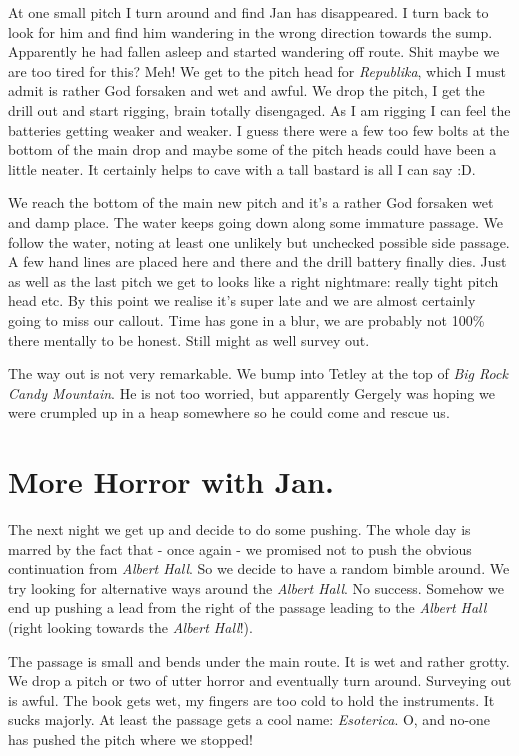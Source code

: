 At one small pitch I turn around and find Jan has disappeared. I turn
back to look for him and find him wandering in the wrong direction
towards the sump. Apparently he had fallen asleep and started wandering
off route. Shit maybe we are too tired for this? Meh! We get to the
pitch head for \emph{Republika}, which I must admit is rather God
forsaken and wet and awful. We drop the pitch, I get the drill out and
start rigging, brain totally disengaged. As I am rigging I can feel the
batteries getting weaker and weaker. I guess there were a few too few
bolts at the bottom of the main drop and maybe some of the pitch heads
could have been a little neater. It certainly helps to cave with a tall
bastard is all I can say :D.

We reach the bottom of the main new pitch and it's a rather God forsaken
wet and damp place. The water keeps going down along some immature
passage. We follow the water, noting at least one unlikely but unchecked
possible side passage. A few hand lines are placed here and there and
the drill battery finally dies. Just as well as the last pitch we get to
looks like a right nightmare: really tight pitch head etc. By this point
we realise it's super late and we are almost certainly going to miss our
callout. Time has gone in a blur, we are probably not 100\% there
mentally to be honest. Still might as well survey out.

The way out is not very remarkable. We bump into Tetley at the top of
\emph{Big Rock Candy Mountain}. He is not too worried, but apparently
Gergely was hoping we were crumpled up in a heap somewhere so he could
come and rescue us.



\section{More Horror with Jan.}

The next night we get up and decide to do some pushing. The whole day is
marred by the fact that - once again - we promised not to push the
obvious continuation from \emph{Albert Hall}. So we decide to have a
random bimble around. We try looking for alternative ways around the
\emph{Albert Hall}. No success. Somehow we end up pushing a lead from
the right of the passage leading to the \emph{Albert Hall} (right
looking towards the \emph{Albert Hall}!).

The passage is small and bends under the main route. It is wet and
rather grotty. We drop a pitch or two of utter horror and eventually
turn around. Surveying out is awful. The book gets wet, my fingers are
too cold to hold the
instruments.
It sucks majorly. At least the passage gets a cool name:
\emph{Esoterica}. O, and no-one has pushed the pitch where we stopped!

